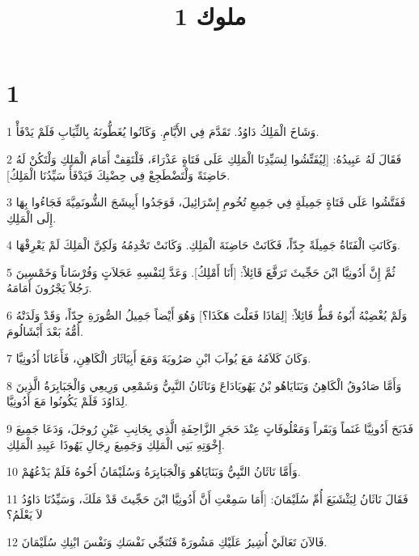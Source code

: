 

\title{1 ملوك}


\chapter{1}

\par 1 وَشَاخَ الْمَلِكُ دَاوُدُ. تَقَدَّمَ فِي الأَيَّامِ. وَكَانُوا يُغَطُّونَهُ بِالثِّيَابِ فَلَمْ يَدْفَأْ.
\par 2 فَقَالَ لَهُ عَبِيدُهُ: [لِيُفَتِّشُوا لِسَيِّدِنَا الْمَلِكِ عَلَى فَتَاةٍ عَذْرَاءَ، فَلْتَقِفْ أَمَامَ الْمَلِكِ وَلْتَكُنْ لَهُ حَاضِنَةً وَلْتَضْطَجِعْ فِي حِضْنِكَ فَيَدْفَأَ سَيِّدُنَا الْمَلِكُ].
\par 3 فَفَتَّشُوا عَلَى فَتَاةٍ جَمِيلَةٍ فِي جَمِيعِ تُخُومِ إِسْرَائِيلَ، فَوَجَدُوا أَبِيشَجَ الشُّونَمِيَّةَ فَجَاءُوا بِهَا إِلَى الْمَلِكِ.
\par 4 وَكَانَتِ الْفَتَاةُ جَمِيلَةً جِدّاً، فَكَانَتْ حَاضِنَةَ الْمَلِكِ. وَكَانَتْ تَخْدِمُهُ وَلَكِنَّ الْمَلِكَ لَمْ يَعْرِفْهَا.
\par 5 ثُمَّ إِنَّ أَدُونِيَّا ابْنَ حَجِّيثَ تَرَفَّعَ قَائِلاً: [أَنَا أَمْلِكُ]. وَعَدَّ لِنَفْسِهِ عَجَلاَتٍ وَفُرْسَاناً وَخَمْسِينَ رَجُلاً يَجْرُونَ أَمَامَهُ.
\par 6 وَلَمْ يُغْضِبْهُ أَبُوهُ قَطُّ قَائِلاً: [لِمَاذَا فَعَلْتَ هَكَذَا؟] وَهُوَ أَيْضاً جَمِيلُ الصُّورَةِ جِدّاً، وَقَدْ وَلَدَتْهُ أُمُّهُ بَعْدَ أَبْشَالُومَ.
\par 7 وَكَانَ كَلاَمُهُ مَعَ يُوآبَ ابْنِ صَرُويَةَ وَمَعَ أَبِيَاثَارَ الْكَاهِنِ، فَأَعَانَا أَدُونِيَّا.
\par 8 وَأَمَّا صَادُوقُ الْكَاهِنُ وَبَنَايَاهُو بْنُ يَهُويَادَاعَ وَنَاثَانُ النَّبِيُّ وَشَمْعِي وَرِيعِي وَالْجَبَابِرَةُ الَّذِينَ لِدَاوُدَ فَلَمْ يَكُونُوا مَعَ أَدُونِيَّا.
\par 9 فَذَبَحَ أَدُونِيَّا غَنَماً وَبَقَراً وَمَعْلُوفَاتٍ عِنْدَ حَجَرِ الزَّاحِفَةِ الَّذِي بِجَانِبِ عَيْنِ رُوجَلَ، وَدَعَا جَمِيعَ إِخْوَتِهِ بَنِي الْمَلِكِ وَجَمِيعَ رِجَالِ يَهُوذَا عَبِيدِ الْمَلِكِ.
\par 10 وَأَمَّا نَاثَانُ النَّبِيُّ وَبَنَايَاهُو وَالْجَبَابِرَةُ وَسُلَيْمَانُ أَخُوهُ فَلَمْ يَدْعُهُمْ.
\par 11 فَقَالَ نَاثَانُ لِبَثْشَبَعَ أُمِّ سُلَيْمَانَ: [أَمَا سَمِعْتِ أَنَّ أَدُونِيَّا ابْنَ حَجِّيثَ قَدْ مَلَكَ، وَسَيِّدُنَا دَاوُدُ لاَ يَعْلَمُ؟
\par 12 فَالآنَ تَعَالَيْ أُشِيرُ عَلَيْكِ مَشُورَةً فَتُنَجِّي نَفْسَكِ وَنَفْسَ ابْنِكِ سُلَيْمَانَ.
